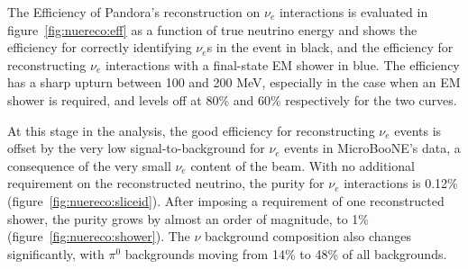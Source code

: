 \documentclass[a4paper]{article}
\begin{document}
\par The Efficiency of Pandora's reconstruction on $\nu_e$ interactions is evaluated in figure~\ref{fig:nuereco:eff} as a function of true neutrino energy and shows the efficiency for correctly identifying $\nu_e$s in the event in black, and the efficiency for reconstructing $\nu_e$ interactions with a final-state EM shower in blue. The efficiency has a sharp upturn between 100 and 200 MeV, especially in the case when an EM shower is required, and levels off at 80\% and 60\% respectively for the two curves. 
\par At this stage in the analysis, the good efficiency for reconstructing $\nu_e$ events is offset by the very low signal-to-background for $\nu_e$ events in MicroBooNE's data, a consequence of the very small $\nu_e$ content of the beam. With no additional requirement on the reconstructed neutrino, the purity for $\nu_e$ interactions is 0.12\% (figure~\ref{fig:nuereco:sliceid}). After imposing a requirement of one reconstructed shower, the purity grows by almost an order of magnitude, to 1\% (figure~\ref{fig:nuereco:shower}). The $\nu$ background composition also changes significantly, with $\pi^0$ backgrounds moving from 14\% to 48\% of all backgrounds.
\end{document}
